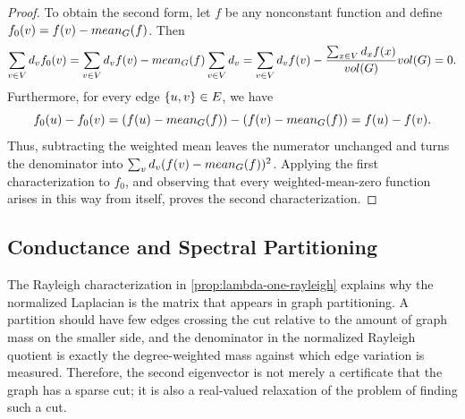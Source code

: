 \begin{proof}
	To obtain the second form, let \(f\) be any nonconstant function and define \(f_0(v)=f(v)-mean_{G}(f)\). Then
	\begin{equation}
		\sum_{v\in V}d_v f_0(v)
		=
		\sum_{v\in V}d_v f(v)-mean_{G}(f)\sum_{v\in V}d_v
		=
		\sum_{v\in V}d_v f(v)-\frac{\sum_{x\in V}d_x f(x)}{vol(G)}vol(G)
		=
		0.
	\end{equation}
	Furthermore, for every edge \(\{u,v\}\in E\), we have
	\begin{equation}
		f_0(u)-f_0(v)=(f(u)-mean_{G}(f))-(f(v)-mean_{G}(f))=f(u)-f(v).
	\end{equation}
	Thus, subtracting the weighted mean leaves the numerator unchanged and turns the denominator into \(\sum_v d_v(f(v)-mean_{G}(f))^2\). Applying the first characterization to \(f_0\), and observing that every weighted-mean-zero function arises in this way from itself, proves the second characterization.
\end{proof}

\subsection{Conductance and Spectral Partitioning}
\label{subsec:conductance-spectral-partitioning}

The Rayleigh characterization in \cref{prop:lambda-one-rayleigh} explains why the normalized Laplacian is the matrix that appears in graph partitioning. A partition should have few edges crossing the cut relative to the amount of graph mass on the smaller side, and the denominator in the normalized Rayleigh quotient is exactly the degree-weighted mass against which edge variation is measured. Therefore, the second eigenvector is not merely a certificate that the graph has a sparse cut; it is also a real-valued relaxation of the problem of finding such a cut.

